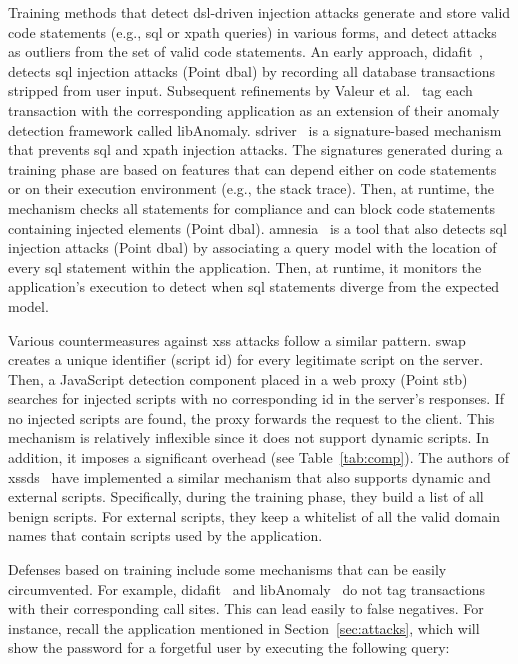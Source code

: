\documentclass[10pt,journal,compsoc]{IEEEtran}
\begin{document}
Training methods that detect {\sc dsl}-driven injection attacks
generate and store valid code statements (e.g., {\sc sql} or {\sc
  xp}ath queries) in various forms, and detect attacks as outliers
from the set of valid code statements. An early approach,
{\sc didafit}~\cite{LLW02}, detects {\sc sql} injection attacks (Point
{\sc dbal}) by recording all database transactions
stripped from user input. Subsequent
refinements by Valeur et al.~\cite{VMV05} tag each transaction with
the corresponding application as an extension of their anomaly
detection framework called libAnomaly.
{\sc sd}river~\cite{MS09,MKS09,MKLS11} is a signature-based mechanism
that prevents {\sc sql} and {\sc xp}ath injection attacks. The
signatures generated during a training phase are based on features
that can depend either on code statements or on their execution
environment (e.g., the stack trace). Then, at runtime, the mechanism
checks all statements for compliance and can block code statements
containing injected elements (Point {\sc dbal}). {\sc
  amnesia}~\cite{HO05,HO06,HO05b} is a tool that also detects {\sc
  sql} injection attacks (Point {\sc dbal}) by associating a query model
with the location of every {\sc sql} statement within the application.
Then, at runtime, it monitors the application's execution to detect
when {\sc sql} statements diverge from the expected model.

Various countermeasures against {\sc xss} attacks follow a similar
pattern. {\sc swap}~\cite{WPLKK09} creates a unique identifier
(script {\sc id}) for every legitimate script on the server.
Then, a JavaScript detection component placed in a web proxy (Point
{\sc s}t{\sc b}) searches for injected scripts with no corresponding {\sc id}
in the server's responses. If no injected scripts are found, the proxy
forwards the request to the client. This mechanism is relatively
inflexible since it does not support dynamic scripts. In addition, it
imposes a significant overhead (see Table~\ref{tab:comp}). The authors
of {\sc xssds}~\cite{JEP08} have implemented a similar mechanism
that also supports dynamic and external scripts. Specifically, during the
training phase, they build a list of all benign scripts. For
external scripts, they keep a whitelist of all the valid domain names
that contain scripts used by the application.

Defenses based on training include some mechanisms that can be easily
circumvented. For example, {\sc didafit}~\cite{LLW02}
and libAnomaly~\cite{VMV05} do not tag transactions with their
corresponding call sites. This can lead
easily to false negatives. For instance, recall the application
mentioned in Section~\ref{sec:attacks}, which will show the password
for a forgetful user by executing the following query:
\end{document}
